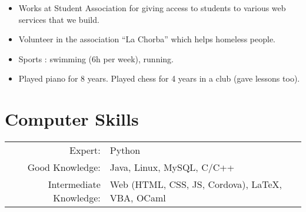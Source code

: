 \documentclass[a4paper,10pt]{article} %
\begin{document}
\begin{itemize}[noitemsep]
  \item Works at Student Association for giving access to students to various web services that we build.
  \item Volunteer in the association ``La Chorba'' which helps homeless people.
  \item Sports : swimming (6h per week), running.
  \item Played piano for 8 years. Played chess for 4 years in a club (gave lessons too).
\end{itemize}



\section{Computer Skills}

\begin{tabular}{rl}
  Expert: & Python\\
  Good Knowledge: & Java, Linux, MySQL, C/C++\\
  Intermediate Knowledge: & Web (HTML, CSS, JS, Cordova), \LaTeX, VBA, OCaml
\end{tabular}
\end{document}
